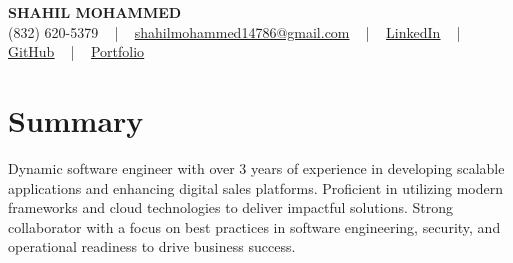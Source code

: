 \documentclass[letterpaper,10pt]{article}
\begin{document}
\begin{center}
    {\fontsize{14pt}{12pt}\selectfont \textbf{\MakeUppercase{Shahil Mohammed}}}\\ \vspace{2pt}
    \fontsize{10pt}{12pt}\selectfont (832) 620-5379 ~ | ~ \href{mailto:shahilmohammed14786@gmail.com}{shahilmohammed14786@gmail.com} ~ | ~  
    \href{https://www.linkedin.com/in/shahil-mohammed-9652931a1/}{\color{blue}\underline{LinkedIn}}  ~ | ~ 
    \href{https://github.com/freakbeast14}{\color{blue}\underline{GitHub}} ~ | ~ 
    \href{https://shahil-mohammed.netlify.app/}{\color{blue}\underline{Portfolio}}
    \vspace{-8pt}
\end{center}

\section{Summary}
\vspace{-2pt}\fontsize{8pt}{9pt}\selectfont
Dynamic software engineer with over 3 years of experience in developing scalable applications and enhancing digital sales platforms. Proficient in utilizing modern frameworks and cloud technologies to deliver impactful solutions. Strong collaborator with a focus on best practices in software engineering, security, and operational readiness to drive business success.
 \vspace{-5pt}
 
\vspace{-2pt}
\end{document}
